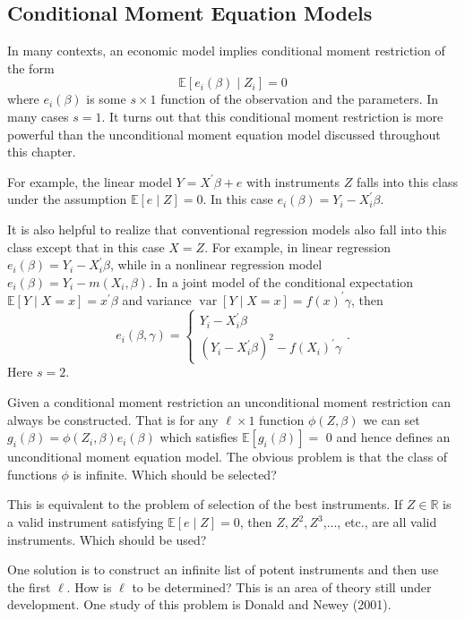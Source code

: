 \documentclass[10pt]{article}
\begin{document}
\subsection{Conditional Moment Equation Models}
In many contexts, an economic model implies conditional moment restriction of the form
$$
\mathbb{E}\left[e_{i}(\beta) \mid Z_{i}\right]=0
$$
where $e_{i}(\beta)$ is some $s \times 1$ function of the observation and the parameters. In many cases $s=1$. It turns out that this conditional moment restriction is more powerful than the unconditional moment equation model discussed throughout this chapter.

For example, the linear model $Y=X^{\prime} \beta+e$ with instruments $Z$ falls into this class under the assumption $\mathbb{E}[e \mid Z]=0$. In this case $e_{i}(\beta)=Y_{i}-X_{i}^{\prime} \beta$.

It is also helpful to realize that conventional regression models also fall into this class except that in this case $X=Z$. For example, in linear regression $e_{i}(\beta)=Y_{i}-X_{i}^{\prime} \beta$, while in a nonlinear regression model $e_{i}(\beta)=Y_{i}-m\left(X_{i}, \beta\right)$. In a joint model of the conditional expectation $\mathbb{E}[Y \mid X=x]=x^{\prime} \beta$ and variance $\operatorname{var}[Y \mid X=x]=f(x)^{\prime} \gamma$, then
$$
e_{i}(\beta, \gamma)=\left\{\begin{array}{c}
Y_{i}-X_{i}^{\prime} \beta \\
\left(Y_{i}-X_{i}^{\prime} \beta\right)^{2}-f\left(X_{i}\right)^{\prime} \gamma
\end{array} .\right.
$$
Here $s=2$.

Given a conditional moment restriction an unconditional moment restriction can always be constructed. That is for any $\ell \times 1$ function $\phi(Z, \beta)$ we can set $g_{i}(\beta)=\phi\left(Z_{i}, \beta\right) e_{i}(\beta)$ which satisfies $\mathbb{E}\left[g_{i}(\beta)\right]=$ 0 and hence defines an unconditional moment equation model. The obvious problem is that the class of functions $\phi$ is infinite. Which should be selected?

This is equivalent to the problem of selection of the best instruments. If $Z \in \mathbb{R}$ is a valid instrument satisfying $\mathbb{E}[e \mid Z]=0$, then $Z, Z^{2}, Z^{3}$,..., etc., are all valid instruments. Which should be used?

One solution is to construct an infinite list of potent instruments and then use the first $\ell$. How is $\ell$ to be determined? This is an area of theory still under development. One study of this problem is Donald and Newey (2001).
\end{document}
